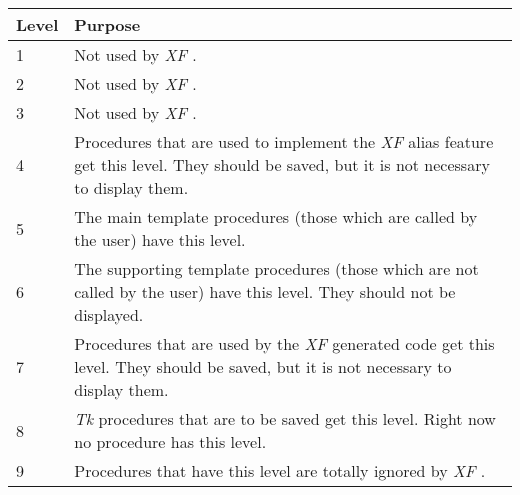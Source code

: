 {\newpage
\clearpage
\samepage \begin{tabular}{|l|p{8.5cm}|} \hline
Level & Purpose\\  \hline
1     & Not used by {\em XF}
.\\  \hline
2     & Not used by {\em XF}
.\\  \hline
3     & Not used by {\em XF}
.\\  \hline
4     & Procedures that are used to implement the {\em XF }
 alias
         feature get this level. They should be saved, but it
         is not necessary to display them.\\  \hline
5     & The main template procedures (those which are called
         by the user) have this level.\\  \hline
6     & The supporting template procedures (those which are
         not called by the user) have this level. They should
         not be displayed.\\  \hline
7     & Procedures that are used by the {\em XF }
 generated code
         get this level. They should be saved, but it is not
         necessary to display them.\\  \hline
8     & {\em Tk }
 procedures that are to be saved get this level.
         Right now no procedure has this level.\\  \hline
9     & Procedures that have this level are totally ignored
         by {\em XF}
.\\  \hline
\end{tabular}
}

{\newpage
\clearpage
\samepage \begin{figure}[ht]
  \centerline{
  \epsfysize=6cm
  }
  
  \label{fig:BYO design}
\end{figure}
}

{\newpage
\clearpage
\samepage \begin{figure}[ht]
  \centerline{
  \epsfysize=6cm
  }
  
  \label{fig:XF design}
\end{figure}
}

